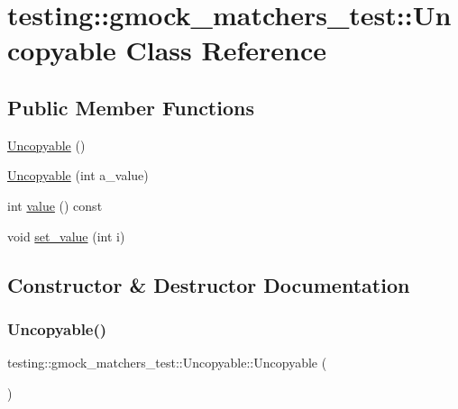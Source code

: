 \hypertarget{classtesting_1_1gmock__matchers__test_1_1_uncopyable}{}\section{testing\+:\+:gmock\+\_\+matchers\+\_\+test\+:\+:Uncopyable Class Reference}
\label{classtesting_1_1gmock__matchers__test_1_1_uncopyable}
\subsection*{Public Member Functions}
\begin{DoxyCompactItemize}
\item 
\hyperlink{classtesting_1_1gmock__matchers__test_1_1_uncopyable_a29cd3836f686c1e9c47e5e0f98c56b13}{Uncopyable} ()
\item 
\hyperlink{classtesting_1_1gmock__matchers__test_1_1_uncopyable_a827c1de4fe4c2e40791dd87a13972bc7}{Uncopyable} (int a\+\_\+value)
\item 
int \hyperlink{classtesting_1_1gmock__matchers__test_1_1_uncopyable_a23512131b948e40ded06555848829866}{value} () const
\item 
void \hyperlink{classtesting_1_1gmock__matchers__test_1_1_uncopyable_a3f30b54f22caac3aa7e6fb79012dc52f}{set\+\_\+value} (int i)
\end{DoxyCompactItemize}


\subsection{Constructor \& Destructor Documentation}
\mbox{\label{classtesting_1_1gmock__matchers__test_1_1_uncopyable_a29cd3836f686c1e9c47e5e0f98c56b13}} 
\subsubsection{\texorpdfstring{Uncopyable()}{Uncopyable()}\hspace{0.1cm}{\footnotesize\ttfamily [1/2]}}
{\footnotesize\ttfamily testing\+::gmock\+\_\+matchers\+\_\+test\+::\+Uncopyable\+::\+Uncopyable (\begin{DoxyParamCaption}{ }\end{DoxyParamCaption})\hspace{0.3cm}{\ttfamily [inline]}}

